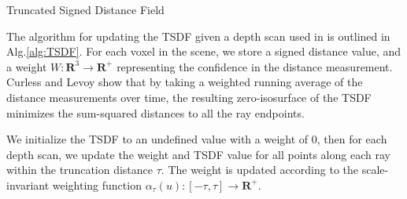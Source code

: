\documentclass[conference]{IEEEtran}
\newcommand{\algoref}[1]{Alg.\ref{#1}}
\begin{document}
\begin{algorithm}[t!]
	\caption{Truncated Signed Distance Field}
	\label{alg:TSDF}
	\begin{algorithmic}[1]
		 
			 
				 
				\label{alg:line:dynamic_tsdf}
			     
				    	\label{alg:line:voxel_carve}
					\EndIf
			    \EndFor
				 		 
					\label{alg:line:tsdf_update}
				\EndFor
			\EndFor
		\EndFor
	\end{algorithmic}
\end{algorithm}

The algorithm for updating the TSDF given a depth scan used in
\cite{Curless1996} is outlined in
\algoref{alg:TSDF}. For each voxel in the scene, we store a signed distance
value, and a weight $W : \mathbf{R}^3 \to \mathbf{R^{+}}$ representing the confidence
in the distance measurement. Curless and Levoy show that by taking a weighted
running average of the distance measurements over time,  the resulting
zero-isosurface of the TSDF minimizes the sum-squared distances to all the ray
endpoints.

We initialize the TSDF to an undefined value with a
weight of $0$, then for each depth scan, we update the weight and TSDF value
for all points along each ray within the truncation distance $\tau$. The weight
is updated according to the scale-invariant weighting function $\alpha_{\tau}(u)
:[-\tau,\tau]\to \mathbf{R^{+}} $.

% 
%  
\end{document}
